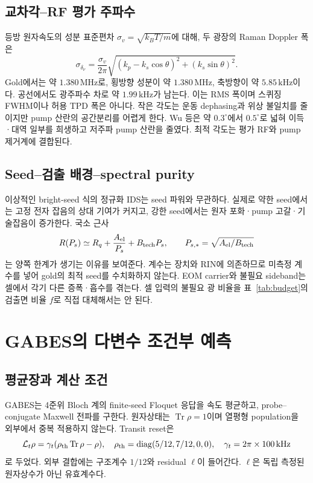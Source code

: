 \documentclass[11pt,a4paper]{article}
\newcommand{\MHz}{\,\mathrm{MHz}}
\newcommand{\kHz}{\,\mathrm{kHz}}
\newcommand{\Tr}{\operatorname{Tr}}
\begin{document}
\subsection{교차각--RF 평가 주파수}
등방 원자속도의 성분 표준편차 $\sigma_v=\sqrt{k_BT/m}$에 대해,
두 광장의 Raman Doppler 폭은
\begin{equation}
 \sigma_{\delta_\nu}=\frac{\sigma_v}{2\pi}
 \sqrt{(k_p-k_s\cos\theta)^2+(k_s\sin\theta)^2}.
 \label{eq:angle}
\end{equation}
Gold에서는 약 $1.380\MHz$로, 횡방향 성분이 약 $1.380\MHz$,
축방향이 약 $5.85\kHz$이다. 공선에서도 광주파수 차로 약 $1.99\kHz$가
남는다. 이는 RMS 폭이며 스퀴징 FWHM이나 허용 TPD 폭은 아니다.
작은 각도는 운동 dephasing과 위상 불일치를 줄이지만 pump 산란의
공간분리를 어렵게 한다. Wu 등은 약 $0.3^\circ$에서 $0.5^\circ$로
넓혀 이득·대역 일부를 희생하고 저주파 pump 산란을 줄였다\cite{wu}.
최적 각도는 평가 RF와 pump 제거계에 결합된다.

\subsection{Seed--검출 배경--spectral purity}
이상적인 bright-seed 식의 정규화 IDS는 seed 파워와 무관하다.
실제로 약한 seed에서는 고정 전자 잡음의 상대 기여가 커지고, 강한 seed에서는
원자 포화·pump 고갈·기술잡음이 증가한다. 국소 근사
\begin{equation}
 R(P_s)\simeq R_q+\frac{A_{\rm el}}{P_s}+B_{\rm tech}P_s,\qquad
 P_{s,*}=\sqrt{A_{\rm el}/B_{\rm tech}}
\end{equation}
는 양쪽 한계가 생기는 이유를 보여준다. 계수는 장치와 RIN에 의존하므로
미측정 계수를 넣어 gold의 최적 seed를 수치화하지 않는다.
EOM carrier와 불필요 sideband는 셀에서 각기 다른 증폭·흡수를 겪는다.
셀 입력의 불필요 광 비율을 표~\ref{tab:budget}의 검출면 비율 $f$로
직접 대체해서는 안 된다.

\section{GABES의 다변수 조건부 예측}
\subsection{평균장과 계산 조건}
GABES는 4준위 Bloch 계의 finite-seed Floquet 응답을 속도 평균하고,
probe--conjugate Maxwell 전파를 구한다. 원자상태는 $\Tr\rho=1$이며
열평형 population을 외부에서 중복 적용하지 않는다. Transit reset은
\begin{equation}
 \mathcal L_t\rho=\gamma_t(\rho_{\rm th}\Tr\rho-\rho),\quad
 \rho_{\rm th}=\operatorname{diag}(5/12,7/12,0,0),\quad
 \gamma_t=2\pi\times100\kHz
\end{equation}
로 두었다. 외부 결합에는 구조계수 $1/12$와 residual $\ell$이 들어간다.
$\ell$은 독립 측정된 원자상수가 아닌 유효계수다.
\end{document}
